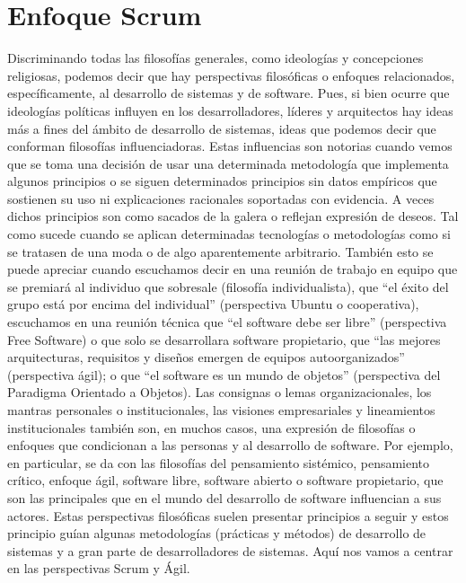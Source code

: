 \chapter{Enfoque Scrum}

Discriminando todas las filosofías generales, como ideologías y concepciones religiosas, podemos decir que hay perspectivas filosóficas o enfoques relacionados, específicamente, al desarrollo de sistemas y de software. Pues, si bien ocurre que ideologías políticas influyen en los desarrolladores, líderes y arquitectos hay ideas más a fines del ámbito de desarrollo de sistemas, ideas que podemos decir que conforman filosofías influenciadoras. Estas influencias son notorias cuando vemos que se toma una decisión de usar una determinada metodología que implementa algunos principios o se siguen determinados principios sin datos empíricos que sostienen su uso ni explicaciones racionales soportadas con evidencia. A veces dichos principios son como sacados de la galera o reflejan expresión de deseos. Tal como sucede cuando se aplican determinadas tecnologías o metodologías como si se tratasen de una moda o de algo aparentemente arbitrario. También esto se puede apreciar cuando escuchamos decir en una reunión de trabajo en equipo que se premiará al individuo que sobresale (filosofía individualista), que “el éxito del grupo está por encima del individual” (perspectiva Ubuntu o cooperativa), escuchamos en una reunión técnica que “el software debe ser libre” (perspectiva Free Software) o que solo se desarrollara software propietario, que “las mejores arquitecturas, requisitos y diseños emergen de equipos autoorganizados” \cite{Beck-2001} (perspectiva ágil); o que “el software es un mundo de objetos” (perspectiva del Paradigma Orientado a Objetos). Las consignas o lemas organizacionales, los mantras personales o institucionales, las visiones empresariales y lineamientos institucionales también son, en muchos casos, una expresión de filosofías o enfoques que condicionan a las personas y al desarrollo de software. Por ejemplo, en particular, se da con las filosofías del pensamiento sistémico, pensamiento crítico, enfoque ágil, software libre, software abierto o software propietario, que son las principales que en el mundo del desarrollo de software influencian a sus actores. Estas perspectivas filosóficas suelen presentar principios a seguir y estos principio guían algunas metodologías (prácticas y métodos) de desarrollo de sistemas y a gran parte de desarrolladores de sistemas. Aquí nos vamos a centrar en las perspectivas Scrum y Ágil.

